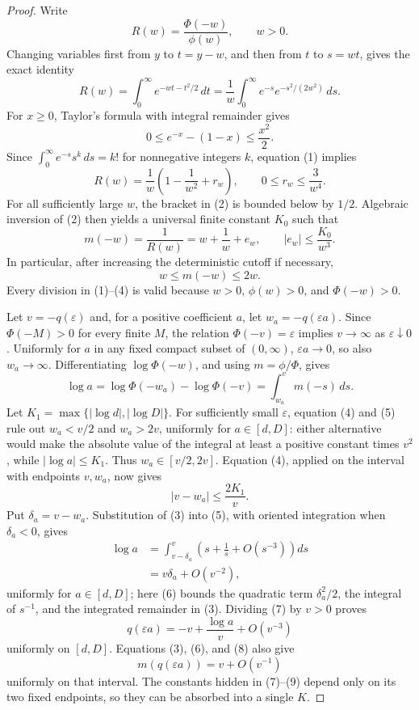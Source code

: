 \documentclass{article}
\begin{document}
\begin{proof}
Write
\[
 R(w)=\frac{\Phi(-w)}{\phi(w)},\qquad w>0.
\]
Changing variables first from \(y\) to \(t=y-w\), and then from \(t\) to \(s=wt\), gives the exact identity
\[
 R(w)=\int_0^\infty e^{-wt-t^2/2}\,dt
 =\frac1w\int_0^\infty e^{-s}e^{-s^2/(2w^2)}\,ds.
\tag{1}
\]
For \(x\geq0\), Taylor's formula with integral remainder gives
\[
 0\leq e^{-x}-(1-x)\leq \frac{x^2}{2}.
\]
Since \(\int_0^\infty e^{-s}s^k\,ds=k!\) for nonnegative integers \(k\), equation (1) implies
\[
 R(w)=\frac1w\left(1-\frac1{w^2}+r_w\right),
 \qquad 0\leq r_w\leq\frac3{w^4}.
\tag{2}
\]
For all sufficiently large \(w\), the bracket in (2) is bounded below by \(1/2\). Algebraic inversion of (2) then yields a universal finite constant \(K_0\) such that
\[
 m(-w)=\frac1{R(w)}=w+\frac1w+e_w,
 \qquad |e_w|\leq\frac{K_0}{w^3}.
\tag{3}
\]
In particular, after increasing the deterministic cutoff if necessary,
\[
 w\leq m(-w)\leq2w.
\tag{4}
\]
Every division in (1)--(4) is valid because \(w>0\), \(\phi(w)>0\), and \(\Phi(-w)>0\).

Let \(v=-q(\varepsilon)\) and, for a positive coefficient \(a\), let \(w_a=-q(\varepsilon a)\). Since \(\Phi(-M)>0\) for every finite \(M\), the relation \(\Phi(-v)=\varepsilon\) implies \(v\to\infty\) as \(\varepsilon\downarrow0\). Uniformly for \(a\) in any fixed compact subset of \((0,\infty)\), \(\varepsilon a\to0\), so also \(w_a\to\infty\). Differentiating \(\log\Phi(-w)\), and using \(m=\phi/\Phi\), gives
\[
 \log a
 =\log\Phi(-w_a)-\log\Phi(-v)
 =\int_{w_a}^{v}m(-s)\,ds.
\tag{5}
\]
Let \(K_1=\max\{|\log d|,|\log D|\}\). For sufficiently small \(\varepsilon\), equation (4) and (5) rule out \(w_a<v/2\) and \(w_a>2v\), uniformly for \(a\in[d,D]\): either alternative would make the absolute value of the integral at least a positive constant times \(v^2\), while \(|\log a|\leq K_1\). Thus \(w_a\in[v/2,2v]\). Equation (4), applied on the interval with endpoints \(v,w_a\), now gives
\[
 |v-w_a|\leq\frac{2K_1}{v}.
\tag{6}
\]
Put \(\delta_a=v-w_a\). Substitution of (3) into (5), with oriented integration when \(\delta_a<0\), gives
\[
 \begin{aligned}
 \log a
 &=\int_{v-\delta_a}^{v}
 \left(s+\frac1s+O(s^{-3})\right)ds\\
 &=v\delta_a+O(v^{-2}),
 \end{aligned}
\tag{7}
\]
uniformly for \(a\in[d,D]\); here (6) bounds the quadratic term \(\delta_a^2/2\), the integral of \(s^{-1}\), and the integrated remainder in (3). Dividing (7) by \(v>0\) proves
\[
 q(\varepsilon a)=-v+\frac{\log a}{v}+O(v^{-3})
\tag{8}
\]
uniformly on \([d,D]\). Equations (3), (6), and (8) also give
\[
 m(q(\varepsilon a))=v+O(v^{-1})
\tag{9}
\]
uniformly on that interval. The constants hidden in (7)--(9) depend only on its two fixed endpoints, so they can be absorbed into a single \(K\).


\end{proof}
\end{document}
